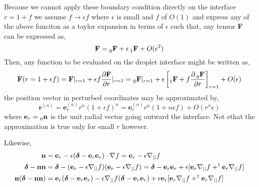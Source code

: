 Because we cannot apply these boundary condition directly on the interface $r = 1 + f$ we assume $f \to \epsilon f$ where $\epsilon$ is small and $f$ of $O(1)$ and express any of the above funciton as a taylor expansion in terms of $\epsilon$ such that, any tensor \textbf{F} can be expressed as, 
\begin{equation}
    \textbf{F}
    = \prescript{}{0}{\textbf{F}}
    + \epsilon \prescript{}{1}{\textbf{F}}
    + O(\epsilon^2)
\end{equation}
Then, any function to be evaluated on the droplet interface might be written as, 
\begin{equation}
    \textbf{F}(r=1+\epsilon f)
    =
    \textbf{F}|_{r=1}
    + \epsilon f \frac{\partial \textbf{F}}{\partial r}|_{r=1}
    =
    \prescript{}{0}{\textbf{F}}|_{r=1}
    + \epsilon \left[\prescript{}{1}{\textbf{F}}
    + f \frac{\partial\prescript{}{0}{\textbf{F}}}{\partial r}\right]_{r=1}
    + O(\epsilon)
\end{equation}
the position vector in perturbed coordinates may be approximated by, 
\begin{equation}
    \textbf{r}^{(n)} 
    = \textbf{e}_r^{(n)} r^n (1+\epsilon f)^n
    = \textbf{e}_r^{(n)} r^n (1+ n\epsilon f) + O(r^n \epsilon)
\end{equation}
where $\textbf{e}_r = \prescript{}{0}{\textbf{n}}$ is the unit radial vector going outward the interface.
Not ethat the approximation is true only for small $r$ however. 

Likewise,
\begin{align}
    \textbf{n} 
    &= \textbf{e}_r - \epsilon (\bm\delta - \textbf{e}_r\textbf{e}_r)\cdot \mathbf{\nabla} f
    = \textbf{e}_r - \epsilon  \mathbf{\nabla}_{||} f\\
    \bm\delta - \textbf{nn} 
    &=
    \bm\delta
    - (\textbf{e}_r - \epsilon \mathbf{\nabla}_{||} f)
    (\textbf{e}_r - \epsilon \mathbf{\nabla}_{||} f)
    =
    \bm\delta
    - \textbf{e}_r\textbf{e}_r
    + \epsilon [
        \textbf{e}_r \mathbf{\nabla}_{||} f
        + ^\dagger \textbf{e}_r \mathbf{\nabla}_{||} f
    ]\\
    \textbf{n}(\bm\delta - \textbf{nn}) 
    &=
    \textbf{e}_r(\bm\delta
    - \textbf{e}_r\textbf{e}_r)
    - \epsilon \mathbf{\nabla}_{||} f (\bm\delta
    - \textbf{e}_r\textbf{e}_r)
    + \epsilon \textbf{e}_r [
        \textbf{e}_r \mathbf{\nabla}_{||} f
        + ^\dagger \textbf{e}_r \mathbf{\nabla}_{||} f
    ]
\end{align}

